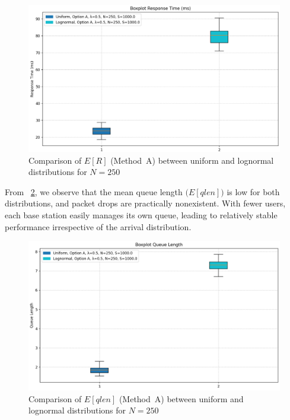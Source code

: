 \documentclass{report}
\begin{document}
\begin{figure}[H]
    \centering
    \includegraphics[width=\textwidth]{img/plots/N-vary/R_A_N250.png}
    \caption{Comparison of \(E[R]\) (Method~A) between uniform and lognormal distributions for \(N = 250\)}
    \label{fig:R_A_N250}
\end{figure}

\begin{flushleft}
From \figurename~\ref{fig:Q_A_N250}, we observe that the mean queue length \(\bigl(E[qlen]\bigr)\) is low for both distributions, and packet drops are practically nonexistent. With fewer users, each base station easily manages its own queue, leading to relatively stable performance irrespective of the arrival distribution.
\end{flushleft}

\begin{figure}[H]
    \centering
    \includegraphics[width=\textwidth]{img/plots/N-vary/Q_A_N250.png}
    \caption{Comparison of \(E[qlen]\) (Method~A) between uniform and lognormal distributions for \(N = 250\)}
    \label{fig:Q_A_N250}
\end{figure}
\end{document}
